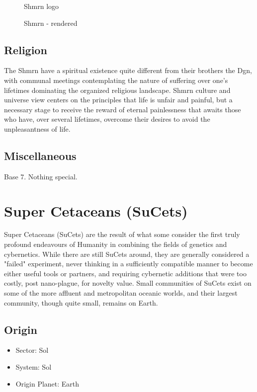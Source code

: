 \begin{figure}
\begin{center}
    \caption{Shmrn logo}
    \label{fig:Shmrn-logo}
\end{center}
\end{figure}
\begin{figure}
\begin{center}
    \caption{Shmrn - rendered}
    \label{fig:Shmrn-render}
\end{center}
\end{figure}

\subsection{Religion}
The Shmrn have a spiritual existence quite different from their
brothers the Dgn, with communal meetings contemplating the nature of
suffering over one's lifetimes dominating the organized religious
landscape. Shmrn culture and universe view centers on the principles
that life is unfair and painful, but a necessary stage to receive the
reward of eternal painlessness that awaits those who have, over
several lifetimes, overcome their desires to avoid the unpleasantness
of life.

\subsection{Miscellaneous}
Base 7. Nothing special. 

\section{Super Cetaceans (SuCets)}

Super Cetaceans (SuCets) are the result of what some consider the
first truly profound endeavours of Humanity in combining the fields of
genetics and cybernetics. While there are still SuCets around, they
are generally considered a "failed" experiment, never thinking in a
sufficiently compatible manner to become either useful tools or
partners, and requiring cybernetic additions that were too costly,
post nano-plague, for novelty value. Small communities of SuCets exist
on some of the more affluent and metropolitan oceanic worlds, and
their largest community, though quite small, remains on Earth.

\subsection{Origin}
\begin{itemize}
\item Sector: Sol
\item System: Sol
\item Origin Planet: Earth
\end{itemize}

